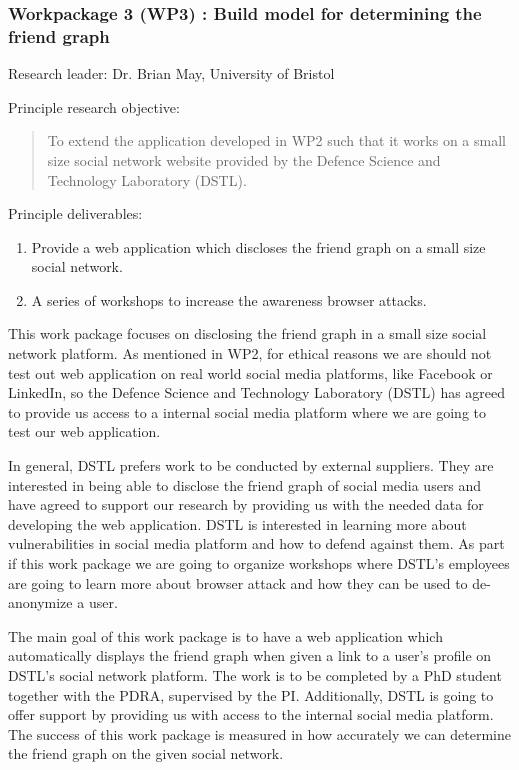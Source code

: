 \documentclass[a4paper,11pt]{article}
\begin{document}
\subsubsection*{Workpackage 3 (WP3) : Build model for determining the friend graph}
Research leader: Dr. Brian May, University of Bristol

Principle research objective:
\begin{quote}
	To extend the application developed in WP2 such that it works on a small size social network website provided by the Defence Science and Technology Laboratory (DSTL).
\end{quote}

Principle deliverables:
\begin{enumerate}
\item Provide a web application which discloses the friend graph on a small size social network.
\item A series of workshops to increase the awareness browser attacks.
\end{enumerate}

This work package focuses on disclosing the friend graph in a small size social network platform. As mentioned in WP2, for ethical reasons we are should not test out web application on real world social media platforms, like Facebook or LinkedIn, so the Defence Science and Technology Laboratory (DSTL) has agreed to provide us access to a internal social media platform where we are going to test our web application. 

In general, DSTL prefers work to be conducted by external suppliers. They are interested in being able to disclose the friend graph of social media users and have agreed to support our research by providing us with the needed data for developing the web application. DSTL is interested in learning more about vulnerabilities in social media platform and how to defend against them. As part if this work package we are going to organize workshops where DSTL's employees are going to learn more about browser attack and how they can be used to de-anonymize a user. 

The main goal of this work package is to have a web application which automatically displays the friend graph when given a link to a user's profile on DSTL's social network platform. The work is to be completed by a PhD student together with the PDRA, supervised by the PI. Additionally, DSTL is going to offer support by providing us with access to the internal social media platform. The success of this work package is measured in how accurately we can determine the friend graph on the given social network.
\end{document}
